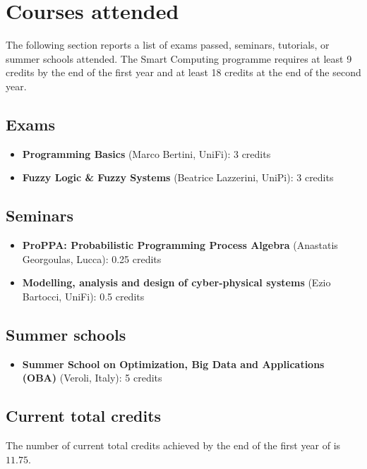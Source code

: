 
\section*{Courses attended}
  The following section reports a list of exams passed, seminars, tutorials, or summer schools attended. The Smart Computing  programme requires at least 9 credits by the end of the first year and at least 18 credits at the end of the second year.

  \subsection*{Exams}
  
    \begin{itemize}
      \item \textbf{ Programming Basics} (Marco Bertini, \ac{UniFi}): 3 credits
      \item \textbf{Fuzzy Logic \& Fuzzy Systems} (Beatrice Lazzerini, \ac{UniPi}): 3 credits
    \end{itemize}
    
  \subsection*{Seminars}
  
    \begin{itemize}
      \item \textbf{\ac{ProPPA}: Probabilistic Programming Process Algebra} (Anastatis Georgoulas,  Lucca): 0.25 credits
      \item \textbf{Modelling, analysis and design of cyber-physical systems} (Ezio Bartocci, \ac{UniFi}): 0.5 credits
    \end{itemize}
    
  \subsection*{Summer schools}
  
    \begin{itemize}
      \item \textbf{Summer School on Optimization, Big Data and Applications (\ac{OBA})} (Veroli, Italy): 5 credits
    \end{itemize}
    
  \subsection*{Current total credits}
  
    The number of current total credits achieved by the end of the first year of  is $11.75$.
    
\newpage
  